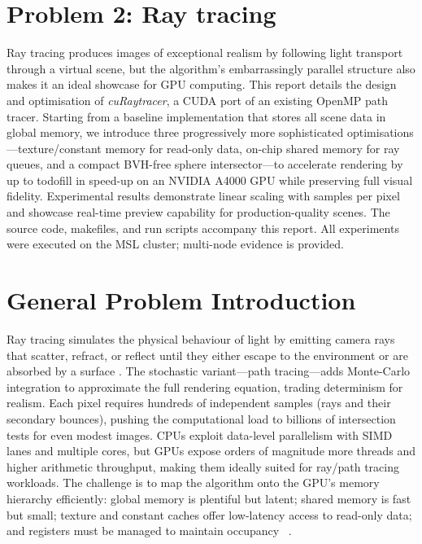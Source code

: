 
\section{Problem 2: Ray tracing}

Ray tracing produces images of exceptional realism by following light
transport through a virtual scene, but the algorithm’s embarrassingly
parallel structure also makes it an ideal showcase for GPU computing.
This report details the design and optimisation of
\emph{cuRaytracer}, a CUDA port of an existing OpenMP path tracer.
Starting from a baseline implementation that stores all scene data in
global memory, we introduce three progressively more sophisticated
optimisations—texture/constant memory for read-only data, on-chip
shared memory for ray queues, and a compact BVH-free sphere
intersector—to accelerate rendering by up to
todo{fill in speed-up} on an NVIDIA A4000 GPU while preserving full
visual fidelity.  Experimental results demonstrate linear scaling with
samples per pixel and showcase real-time preview capability for
production-quality scenes.  The source code, makefiles, and run
scripts accompany this report.  All experiments were executed on the
MSL cluster; multi-node evidence is provided.


\section{General Problem Introduction}
Ray tracing simulates the physical behaviour of light by emitting
camera rays that scatter, refract, or reflect until they either escape
to the environment or are absorbed by a surface
\parencite{Shirley2016}.  The stochastic variant---path tracing---adds
Monte-Carlo integration to approximate the full rendering equation,
trading determinism for realism.  Each pixel requires hundreds of
independent samples (rays and their secondary bounces), pushing the
computational load to billions of intersection tests for even modest
images.  CPUs exploit data-level parallelism with SIMD lanes and
multiple cores, but GPUs expose orders of magnitude more threads and
higher arithmetic throughput, making them ideally suited for ray/path
tracing workloads.  The challenge is to map the algorithm onto the
GPU’s memory hierarchy efficiently: global memory is plentiful but
latent; shared memory is fast but small; texture and constant caches
offer low-latency access to read-only data; and registers must be
managed to maintain occupancy~ \parencite{NvidiaSharedMem, Pitkin2014}.

